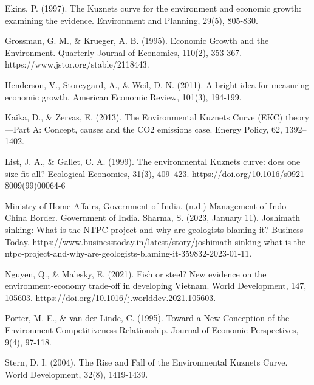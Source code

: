 \documentclass{article}
\begin{document}
Ekins, P. (1997). The Kuznets curve for the environment and economic growth: examining the evidence. Environment and Planning, 29(5), 805-830.

Grossman, G. M., \& Krueger, A. B. (1995). Economic Growth and the Environment. Quarterly Journal of Economics, 110(2), 353-367. https://www.jstor.org/stable/2118443.

Henderson, V., Storeygard, A., \& Weil, D. N. (2011). A bright idea for measuring economic growth. American Economic Review, 101(3), 194-199.

Kaika, D., \& Zervas, E. (2013). The Environmental Kuznets Curve (EKC) theory—Part A: Concept, causes and the CO2 emissions case. Energy Policy, 62, 1392–1402.

List, J. A., \& Gallet, C. A. (1999). The environmental Kuznets curve: does one size fit all? Ecological Economics, 31(3), 409–423. https://doi.org/10.1016/s0921-8009(99)00064-6

Ministry of Home Affairs, Government of India. (n.d.) Management of Indo-China Border. Government of India.
Sharma, S. (2023, January 11). Joshimath sinking: What is the NTPC project and why 
are geologists blaming it? Business Today. https://www.businesstoday.in/latest/story/joshimath-sinking-what-is-the-ntpc-project-and-why-are-geologists-blaming-it-359832-2023-01-11.

Nguyen, Q., \& Malesky, E. (2021). Fish or steel? New evidence on the environment-economy trade-off in developing Vietnam. World Development, 147, 105603. https://doi.org/10.1016/j.worlddev.2021.105603.

Porter, M. E., \& van der Linde, C. (1995). Toward a New Conception of the Environment-Competitiveness Relationship. Journal of Economic Perspectives, 9(4), 97-118.

Stern, D. I. (2004). The Rise and Fall of the Environmental Kuznets Curve. World Development, 32(8), 1419-1439.
\end{document}
